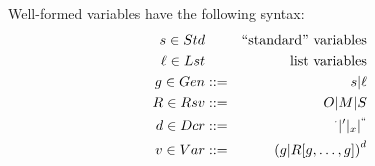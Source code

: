  Well-formed variables have the following syntax:
 \begin{eqnarray*}
    s \in Std && \mbox{``standard'' variables}
 \\ \ell \in Lst && \mbox{list variables}
 \\ g \in Gen &::=&  s | \ell
 \\ R \in Rsv &::=& O | M | S
 \\ d \in Dcr &::=& {}^\cdot | {}' | {}_x | {}^{``}
 \\ v \in Var &::=& \left( g | R [g,\ldots,g] \right)^d
 \end{eqnarray*}
